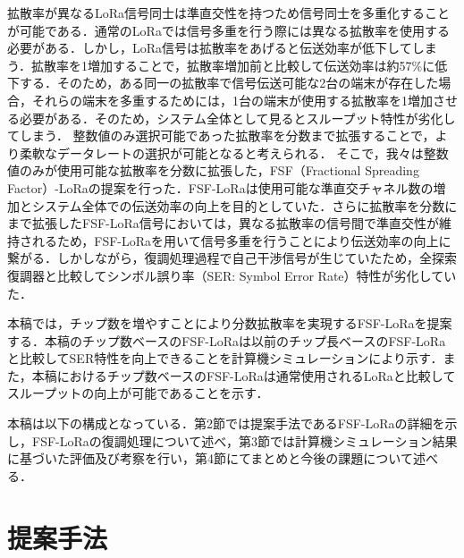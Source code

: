 \documentclass[technicalreport]{ieicej}
\begin{document}
拡散率が異なるLoRa信号同士は準直交性を持つため信号同士を多重化することが可能である．通常のLoRaでは信号多重を行う際には異なる拡散率を使用する必要がある．しかし，LoRa信号は拡散率をあげると伝送効率が低下してしまう．拡散率を1増加することで，拡散率増加前と比較して伝送効率は約57\%に低下する．そのため，ある同一の拡散率で信号伝送可能な2台の端末が存在した場合，それらの端末を多重するためには，1台の端末が使用する拡散率を1増加させる必要がある．そのため，システム全体として見るとスループット特性が劣化してしまう．
整数値のみ選択可能であった拡散率を分数まで拡張することで，より柔軟なデータレートの選択が可能となると考えられる．
そこで，我々は整数値のみが使用可能な拡散率を分数に拡張した，FSF（Fractional Spreading Factor）-LoRaの提案を行った\cite{saitoRCS10,GC3}．FSF-LoRaは使用可能な準直交チャネル数の増加とシステム全体での伝送効率の向上を目的としていた．さらに拡散率を分数にまで拡張したFSF-LoRa信号においては，異なる拡散率の信号間で準直交性が維持されるため，FSF-LoRaを用いて信号多重を行うことにより伝送効率の向上に繋がる．しかしながら，復調処理過程で自己干渉信号が生じていたため，全探索復調器と比較してシンボル誤り率（SER: Symbol Error Rate）特性が劣化していた\cite{GC3,saitoRCS10}．

本稿では，チップ数を増やすことにより分数拡散率を実現するFSF-LoRaを提案する．本稿のチップ数ベースのFSF-LoRaは以前のチップ長ベースのFSF-LoRaと比較してSER特性を向上できることを計算機シミュレーションにより示す．また，本稿におけるチップ数ベースのFSF-LoRaは通常使用されるLoRaと比較してスループットの向上が可能であることを示す．

本稿は以下の構成となっている．第2節では提案手法であるFSF-LoRaの詳細を示し，FSF-LoRaの復調処理について述べ，第3節では計算機シミュレーション結果に基づいた評価及び考察を行い，第4節にてまとめと今後の課題について述べる．



\color{black}
\section{提案手法}
\end{document}
